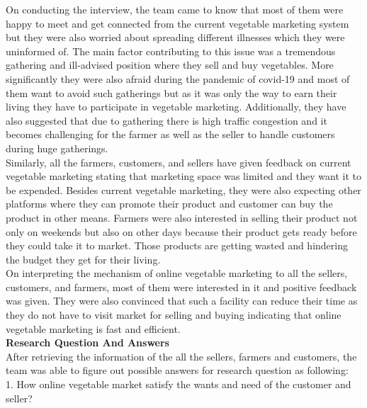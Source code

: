 \documentclass[12pt]{report}
\begin{document}
\begin{normalsize}
On conducting the interview, the team came to know that most of them were happy to meet and get connected from the current vegetable marketing system but they were also worried about spreading different illnesses which they were uninformed of. The main factor contributing to this issue was a tremendous gathering and ill-advised position where they sell and buy vegetables. More significantly they were also afraid during the pandemic of covid-19 and most of them want to avoid such gatherings but as it was only the way to earn their living they have to participate in vegetable marketing. Additionally, they have also suggested that due to gathering there is high traffic congestion and it becomes challenging for the farmer as well as the seller to handle customers during huge gatherings.\newline\\[0.1cm]
Similarly, all the farmers, customers, and sellers have given feedback on current vegetable marketing stating that marketing space was limited and they want it to be expended. Besides current vegetable marketing, they were also expecting other platforms where they can promote their product and customer can buy the product in other means. Farmers were also interested in selling their product not only on weekends but also on other days because their product gets ready before they could take it to market. Those products are getting wasted and hindering the budget they get for their living.\newline\\[0.1cm]
On interpreting the mechanism of online vegetable marketing to all the sellers, customers, and farmers, most of them were interested in it and positive feedback was given. They were also convinced that such a facility can reduce their time as they do not have to visit market for selling and buying indicating that online vegetable marketing is fast and efficient.\newline\\[0.1cm]
{\bfseries Research Question And Answers}\newline\\[0.1cm]
After retrieving the information of the all the sellers, farmers and customers, the team was able to figure out possible answers for research question as following:\newline\\[0.1cm]
1. How online vegetable market satisfy the wants and need of the customer and seller?\newline\\[0.1cm]

\end{normalsize}
\end{document}
